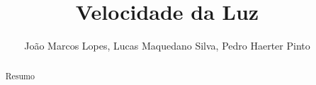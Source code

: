 \documentclass[a4paper,10pt]{article}
\author{João Marcos Lopes, Lucas Maquedano Silva, Pedro Haerter Pinto}
\title{Velocidade da Luz}
\begin{document}
\maketitle
\tableofcontents

\begin{abstract}
Resumo
\end{abstract}
\end{document}
